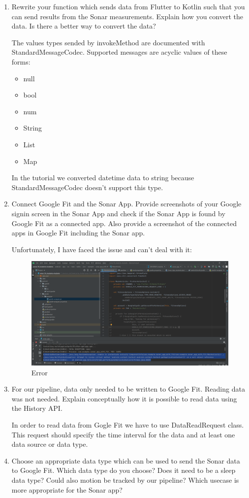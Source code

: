 \documentclass{homework}
\begin{document}
\begin{enumerate}
\item Rewrite your function which sends data from Flutter to Kotlin such that you can send results from the Sonar measurements. Explain how you convert the data. Is there a better way to convert the data?

The values types sended by invokeMethod are documented with StandardMessageCodec. Supported messages are acyclic values of these forms:
\begin{itemize}
	\item null
	\item bool
	\item num
	\item String
	\item List
	\item Map
\end{itemize}
In the tutorial we converted datetime data to string because StandardMessageCodec doesn't support this type.
\item Connect Google Fit and the Sonar App. Provide screenshots of your Google signin screen in the Sonar App and check if the Sonar App is found by Google Fit as a connected app. Also provide a screenshot of the connected apps in Google Fit including the Sonar app.

Unfortunately, I have faced the issue and can't deal with it:
\begin{figure}[hbt!]
	\centering
	\includegraphics[width=1.\textwidth]{ussue.png}
	\caption{Error}
\end{figure}
\item For our pipeline, data only needed to be written to Google Fit. Reading data was not needed. Explain conceptually how it is possible to read data using the History API.

In order to read data from Gogle Fit we have to use DataReadRequest class. This request should specify the time interval for the data and at least one data source or data type.
\item Choose an appropriate data type which can be used to send the Sonar data to Google Fit. Which data type do you choose? Does it need to be a sleep data type? Could also motion be tracked by our pipeline? Which usecase is more appropriate for the Sonar app?


\end{enumerate}
\end{document}

